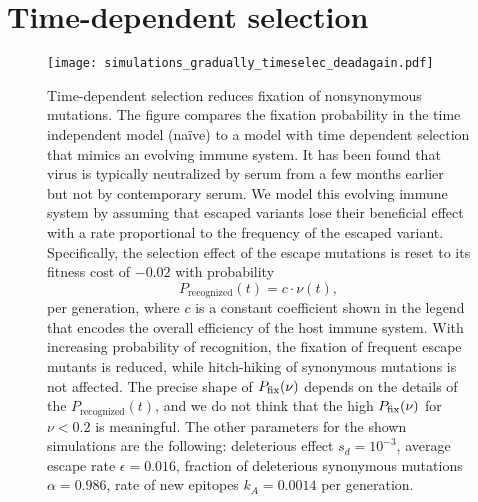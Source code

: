 
\section{Time-dependent selection}
\begin{figure}[!ht]
\begin{center}
\texttt{[image: simulations\_gradually\_timeselec\_deadagain.pdf]}
\caption{
Time-dependent selection reduces fixation of nonsynonymous mutations. The figure
compares the fixation probability in the time independent model (na\"ive) to
a model with time dependent selection that mimics  an evolving immune system.
It has been found that virus is typically neutralized by serum from a few months
earlier~\cite{richman_rapid_2003} but not by contemporary serum. We model this
evolving immune system by assuming that escaped variants lose their beneficial
effect with a rate proportional to the frequency of the escaped variant. 
Specifically, the selection effect of the escape mutations is
reset to its fitness cost of $-0.02$ with probability
\[ P_\text{recognized}(t) = c \cdot \nu(t), \] 
per generation, where $c$ is a constant coefficient shown in the legend that
encodes the overall efficiency of the host immune system. With increasing
probability of recognition, the fixation of frequent escape mutants is reduced,
while hitch-hiking of synonymous mutations is not affected. The precise
shape of $P_{\mathrm{fix}}(\nu)$ depends on the details of the $P_\text{recognized}(t)$, and 
we do not think that the high $P_{\mathrm{fix}}(\nu)$ for $\nu<0.2$ is meaningful.
The other parameters for the shown simulations are
the following: deleterious effect $s_d = 10^{-3}$, average escape rate $\epsilon = 0.016$,
fraction of deleterious synonymous mutations $\alpha = 0.986$, rate of new epitopes
$k_A=0.0014$ per generation.
}
\label{fig:tds}
\end{center}
\end{figure}

